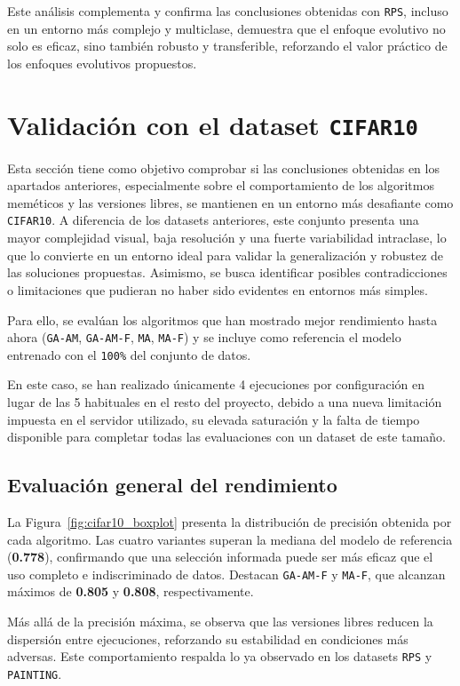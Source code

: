 Este análisis complementa y confirma las conclusiones obtenidas con \texttt{RPS}, incluso en un entorno más complejo y multiclase,
demuestra que el enfoque evolutivo no solo es eficaz, sino también robusto y transferible,
reforzando el valor práctico de los enfoques evolutivos propuestos.


\section{Validación con el dataset \texttt{CIFAR10}}
Esta sección tiene como objetivo comprobar si las conclusiones obtenidas en los apartados anteriores,
especialmente sobre el comportamiento de los algoritmos meméticos y las versiones libres, se mantienen en un entorno más desafiante como \texttt{CIFAR10}.
A diferencia de los datasets anteriores, este conjunto presenta una mayor complejidad visual,
baja resolución y una fuerte variabilidad intraclase, lo que lo convierte en un entorno ideal para validar la generalización y robustez de las soluciones propuestas.
Asimismo, se busca identificar posibles contradicciones o limitaciones que pudieran no haber sido evidentes en entornos más simples.

Para ello, se evalúan los algoritmos que han mostrado mejor rendimiento hasta ahora (\texttt{GA-AM}, \texttt{GA-AM-F}, \texttt{MA}, \texttt{MA-F})
y se incluye como referencia el modelo entrenado con el \texttt{100\%} del conjunto de datos.

En este caso, se han realizado únicamente 4 ejecuciones por configuración en lugar de las 5 habituales en el resto del proyecto,
debido a una nueva limitación impuesta en el servidor utilizado, su elevada saturación y la falta de tiempo disponible para completar todas las evaluaciones con un dataset de este tamaño.

\subsection{Evaluación general del rendimiento}
La Figura~\ref{fig:cifar10_boxplot} presenta la distribución de precisión obtenida por cada algoritmo.
Las cuatro variantes superan la mediana del modelo de referencia (\textbf{0.778}), confirmando que una selección informada puede ser más eficaz que el uso completo e indiscriminado de datos.
Destacan \texttt{GA-AM-F} y \texttt{MA-F}, que alcanzan máximos de \textbf{0.805} y \textbf{0.808}, respectivamente.

Más allá de la precisión máxima, se observa que las versiones libres reducen la dispersión entre ejecuciones, reforzando su estabilidad en condiciones más adversas.
Este comportamiento respalda lo ya observado en los datasets \texttt{RPS} y \texttt{PAINTING}.

